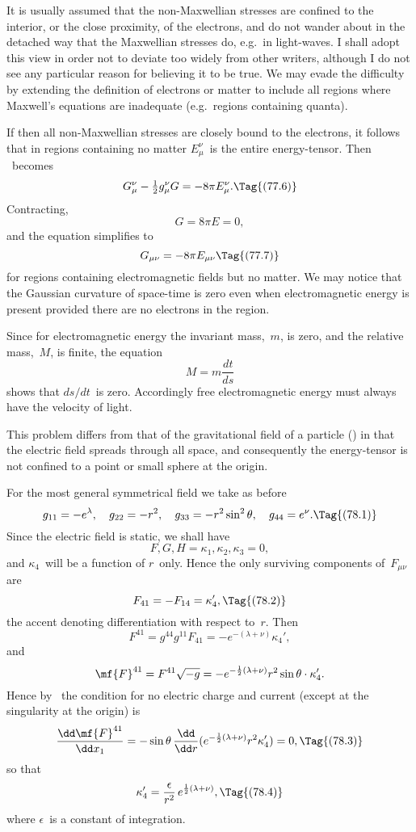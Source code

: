 \documentclass[12pt]{book}
\begin{document}
It is usually assumed that the non\hyp{}Maxwellian stresses are confined to
the interior, or the close proximity, of the electrons, and do not wander about
in the detached way that the Maxwellian stresses do, e.g.\ in light-waves.
I shall adopt this view in order not to deviate too widely from other writers,
although I do not see any particular reason for believing it to be true\footnotemark.\footnotetext
  {We may evade the difficulty by extending the definition of electrons or matter to include all
  regions where Maxwell's equations are inadequate (e.g.\ regions containing quanta).}

If then all non\hyp{}Maxwellian stresses are closely bound to the electrons, it
follows that in regions containing no matter $E_{\mu}^{\nu}$~is the entire energy\hyp{}tensor.
Then ~becomes
\[
G_{\mu}^{\nu} - \tfrac{1}{2} g_{\mu}^{\nu} G = -8\pi E_{\mu}^{\nu}.
\Tag{(77.6)}
\]
Contracting,
\[
G = 8\pi E = 0,
\]
and the equation simplifies to
\[
G_{\mu\nu} = -8\pi E_{\mu\nu}
\Tag{(77.7)}
\]
for regions containing electromagnetic fields but no matter. We may notice
that the Gaussian curvature of space-time is zero even when electromagnetic
energy is present provided there are no electrons in the region.

Since for electromagnetic energy the invariant mass,~$m$, is zero, and the
relative mass,~$M$, is finite, the equation~
\[
M = m \frac{dt}{ds}
\]
shows that $ds/dt$~is zero. Accordingly free electromagnetic energy must always
have the velocity of light.

%

This problem differs from that of the gravitational field of a particle ()
%
in that the electric field spreads through all space, and consequently the
energy\hyp{}tensor is not confined to a point or small sphere at the origin.

For the most general symmetrical field we take as before
\[
g_{11} = -e^{\lambda},\quad
g_{22} = -r^{2},\quad
g_{33} = -r^{2} \sin^{2}\theta,\quad
g_{44} = e^{\nu}.
\Tag{(78.1)}
\]
Since the electric field is static, we shall have
\[
F, G, H = \kappa_{1}, \kappa_{2}, \kappa_{3} = 0,
\]
and $\kappa_{4}$~will be a function of $r$~only. Hence the only surviving components of~$F_{\mu\nu}$
are
\[
F_{41} = -F_{14} = \kappa_{4}',
\Tag{(78.2)}
\]
the accent denoting differentiation with respect to~$r$. Then
\[
F^{41} = g^{44} g^{11} F_{41} = -e^{-(\lambda+\nu)} \kappa_{4}',
\]
and
\[
\mf{F}^{41} = F^{41} \sqrt{-g}
  = -e^{-\frac{1}{2}(\lambda+\nu)} r^{2} \sin\theta \cdot \kappa_{4}'.
\]
Hence by~ the condition for no electric charge and current (except at
the singularity at the origin) is
\[
\frac{\dd\mf{F}^{41}}{\dd x_{1}}
= -\sin\theta\, \frac{\dd}{\dd r}(e^{-\frac{1}{2}(\lambda+\nu)} r^{2}\kappa_{4}') = 0,
\Tag{(78.3)}
\]
so that
\[
\kappa_{4}' = \frac{\epsilon}{r^{2}}\, e^{\frac{1}{2}(\lambda+\nu)},
\Tag{(78.4)}
\]
where $\epsilon$~is a constant of integration.
\end{document}

